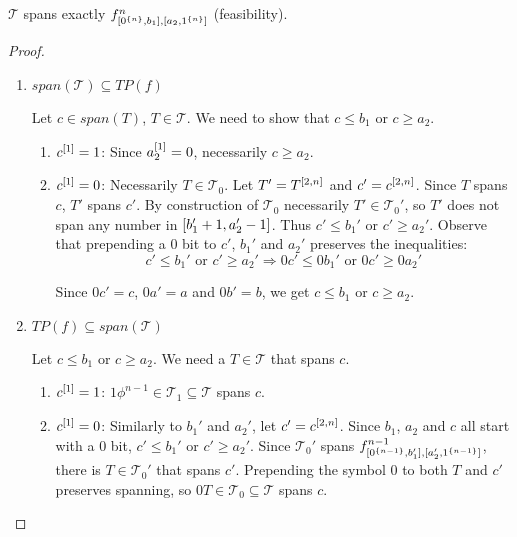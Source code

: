 \begin{theorem}
$\mathcal{T}$ spans exactly
$f^{n}_{[0^{\{n\}}, b_1], [a_2, 1^{\{n\}}]}$ (feasibility).
\end{theorem}

\begin{proof}
\hfill %
\begin{enumerate}
\item{$span(\mathcal{T}) \subseteq TP(f)$}

Let $c \in span(T)$, $T \in \mathcal{T}$.
We need to show that $c \leq b_1$ or $c \geq a_2$.

\begin{enumerate}
\item $c^{[1]} = 1$: Since $a_2^{[1]} = 0$,
necessarily $c \geq a_2$.

\item $c^{[1]} = 0$: Necessarily $T \in \mathcal{T}_0$.
Let $T' = T^{[2, n]}$ and $c' = c^{[2, n]}$.
Since $T$ spans $c$, $T'$ spans $c'$.
By construction of $\mathcal{T}_0$
necessarily $T' \in \mathcal{T}_0'$,
so $T'$ does not span any number
in $[b_1' + 1, a_2' - 1]$.
Thus $c' \leq b_1'$ or $c' \geq a_2'$.
Observe that prepending a $0$ bit
to $c'$, $b_1'$ and $a_2'$
preserves the inequalities:
\[
c' \leq b_1' \text{ or } c' \geq a_2'
\Rightarrow
0 c' \leq 0 b_1' \text{ or } 0 c' \geq 0 a_2'
\]

Since $0 c' = c$, $0 a' = a$ and $0 b' = b$,
we get $c \leq b_1$ or $c \geq a_2$.
\end{enumerate}

\item{$TP(f) \subseteq span(\mathcal{T})$}

Let $c \leq b_1$ or $c \geq a_2$.
We need a $T \in \mathcal{T}$ that spans $c$.

\begin{enumerate}
\item $c^{[1]} = 1$:
$1 \phi^{n-1} \in \mathcal{T}_1 \subseteq \mathcal{T}$
spans $c$.

\item $c^{[1]} = 0$:
Similarly to $b_1'$ and $a_2'$, let $c' = c^{[2, n]}$.
Since $b_1$, $a_2$ and $c$ all start with a $0$ bit,
$c' \leq b_1'$ or $c' \geq a_2'$.
Since $\mathcal{T}_0'$ spans
$f^{n-1}_{[0^{\{n-1\}}, b_1'], [a_2', 1^{\{n-1\}}]}$,
there is $T \in \mathcal{T}_0'$ that spans $c'$.
Prepending the symbol $0$ to both $T$ and $c'$
preserves spanning,
so $0 T \in \mathcal{T}_0 \subseteq \mathcal{T}$ spans $c$.
\end{enumerate}

\end{enumerate}
\end{proof}

